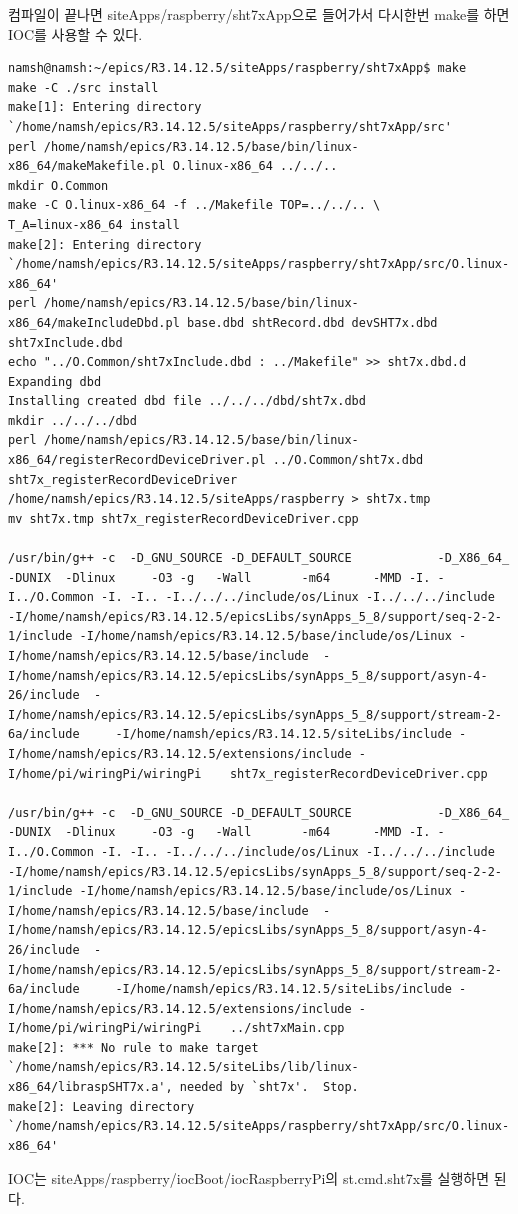 \documentclass[11pt
  , a4paper
  , article
  , oneside
]{memoir}
\begin{document}
컴파일이 끝나면 siteApps/raspberry/sht7xApp으로 들어가서 다시한번 make를 하면 IOC를 사용할 수 있다.
\begin{lstlisting}[style=termstyle]
namsh@namsh:~/epics/R3.14.12.5/siteApps/raspberry/sht7xApp$ make
make -C ./src install 
make[1]: Entering directory `/home/namsh/epics/R3.14.12.5/siteApps/raspberry/sht7xApp/src'
perl /home/namsh/epics/R3.14.12.5/base/bin/linux-x86_64/makeMakefile.pl O.linux-x86_64 ../../..
mkdir O.Common
make -C O.linux-x86_64 -f ../Makefile TOP=../../.. \
T_A=linux-x86_64 install
make[2]: Entering directory `/home/namsh/epics/R3.14.12.5/siteApps/raspberry/sht7xApp/src/O.linux-x86_64'
perl /home/namsh/epics/R3.14.12.5/base/bin/linux-x86_64/makeIncludeDbd.pl base.dbd shtRecord.dbd devSHT7x.dbd sht7xInclude.dbd
echo "../O.Common/sht7xInclude.dbd : ../Makefile" >> sht7x.dbd.d
Expanding dbd
Installing created dbd file ../../../dbd/sht7x.dbd
mkdir ../../../dbd
perl /home/namsh/epics/R3.14.12.5/base/bin/linux-x86_64/registerRecordDeviceDriver.pl ../O.Common/sht7x.dbd sht7x_registerRecordDeviceDriver /home/namsh/epics/R3.14.12.5/siteApps/raspberry > sht7x.tmp
mv sht7x.tmp sht7x_registerRecordDeviceDriver.cpp

/usr/bin/g++ -c  -D_GNU_SOURCE -D_DEFAULT_SOURCE            -D_X86_64_  -DUNIX  -Dlinux     -O3 -g   -Wall       -m64      -MMD -I. -I../O.Common -I. -I.. -I../../../include/os/Linux -I../../../include  -I/home/namsh/epics/R3.14.12.5/epicsLibs/synApps_5_8/support/seq-2-2-1/include -I/home/namsh/epics/R3.14.12.5/base/include/os/Linux -I/home/namsh/epics/R3.14.12.5/base/include  -I/home/namsh/epics/R3.14.12.5/epicsLibs/synApps_5_8/support/asyn-4-26/include  -I/home/namsh/epics/R3.14.12.5/epicsLibs/synApps_5_8/support/stream-2-6a/include     -I/home/namsh/epics/R3.14.12.5/siteLibs/include -I/home/namsh/epics/R3.14.12.5/extensions/include -I/home/pi/wiringPi/wiringPi    sht7x_registerRecordDeviceDriver.cpp 

/usr/bin/g++ -c  -D_GNU_SOURCE -D_DEFAULT_SOURCE            -D_X86_64_  -DUNIX  -Dlinux     -O3 -g   -Wall       -m64      -MMD -I. -I../O.Common -I. -I.. -I../../../include/os/Linux -I../../../include  -I/home/namsh/epics/R3.14.12.5/epicsLibs/synApps_5_8/support/seq-2-2-1/include -I/home/namsh/epics/R3.14.12.5/base/include/os/Linux -I/home/namsh/epics/R3.14.12.5/base/include  -I/home/namsh/epics/R3.14.12.5/epicsLibs/synApps_5_8/support/asyn-4-26/include  -I/home/namsh/epics/R3.14.12.5/epicsLibs/synApps_5_8/support/stream-2-6a/include     -I/home/namsh/epics/R3.14.12.5/siteLibs/include -I/home/namsh/epics/R3.14.12.5/extensions/include -I/home/pi/wiringPi/wiringPi    ../sht7xMain.cpp 
make[2]: *** No rule to make target `/home/namsh/epics/R3.14.12.5/siteLibs/lib/linux-x86_64/libraspSHT7x.a', needed by `sht7x'.  Stop.
make[2]: Leaving directory `/home/namsh/epics/R3.14.12.5/siteApps/raspberry/sht7xApp/src/O.linux-x86_64'
\end{lstlisting}
IOC는 siteApps/raspberry/iocBoot/iocRaspberryPi의 st.cmd.sht7x를 실행하면 된다.
\begin{lstlisting}[style=termstyle]

\end{lstlisting}
\end{document}
